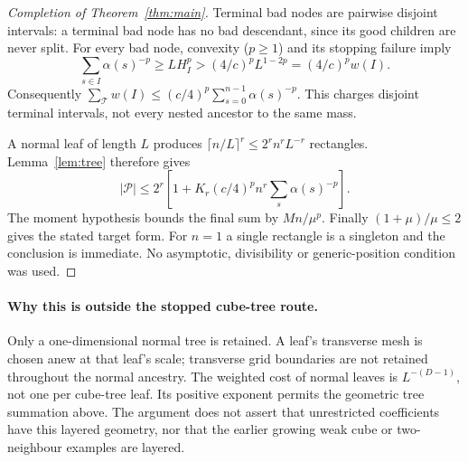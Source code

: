\documentclass[11pt]{article}
\begin{document}
\begin{proof}[Completion of Theorem~\ref{thm:main}]
Terminal bad nodes are pairwise disjoint intervals: a terminal bad node has no bad descendant, since its good children are never split. For every bad node, convexity ($p\ge1$) and its stopping failure imply
\[
 \sum_{s\in I}\alpha(s)^{-p}\ge L H_I^p
 >(4/c)^p L^{1-2p}=(4/c)^p w(I).
\]
Consequently $\sum_{\mathcal T}w(I)\le(c/4)^p\sum_{s=0}^{n-1}\alpha(s)^{-p}$. This charges disjoint terminal intervals, not every nested ancestor to the same mass.

A normal leaf of length $L$ produces $\lceil n/L\rceil^r\le2^r n^r L^{-r}$ rectangles. Lemma~\ref{lem:tree} therefore gives
\[
 |\mathcal P|\le2^r\left[1+K_r(c/4)^p n^r\sum_s\alpha(s)^{-p}\right].
\]
The moment hypothesis bounds the final sum by $Mn/\mu^p$. Finally $(1+\mu)/\mu\le2$ gives the stated target form. For $n=1$ a single rectangle is a singleton and the conclusion is immediate. No asymptotic, divisibility or generic-position condition was used.
\end{proof}

\paragraph{Why this is outside the stopped cube-tree route.}
Only a one-dimensional normal tree is retained. A leaf's transverse mesh is chosen anew at that leaf's scale; transverse grid boundaries are not retained throughout the normal ancestry. The weighted cost of normal leaves is $L^{-(D-1)}$, not one per cube-tree leaf. Its positive exponent permits the geometric tree summation above. The argument does not assert that unrestricted coefficients have this layered geometry, nor that the earlier growing weak cube or two-neighbour examples are layered.
\end{document}
